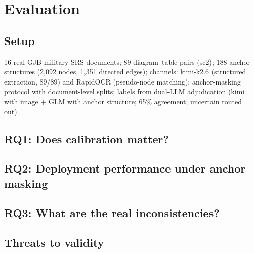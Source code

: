 \documentclass[10pt,twocolumn]{article}
\begin{document}

\section{Evaluation}
\label{sec:evaluation}

\subsection{Setup}
16 real GJB military SRS documents; 89 diagram--table pairs (sc2);
188 anchor structures (2{,}092 nodes, 1{,}351 directed edges);
channels: kimi-k2.6 (structured extraction, 89/89) and RapidOCR
(pseudo-node matching); anchor-masking protocol with document-level
splits; labels from dual-LLM adjudication (kimi with image + GLM with
anchor structure; 65\% agreement; uncertain routed out).

\subsection{RQ1: Does calibration matter?}

\subsection{RQ2: Deployment performance under anchor masking}

\subsection{RQ3: What are the real inconsistencies?}

\subsection{Threats to validity}
\end{document}
